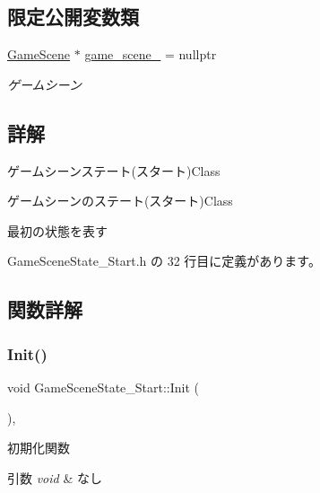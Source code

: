 \subsection*{限定公開変数類}
\begin{DoxyCompactItemize}
\item 
\mbox{\hyperlink{class_game_scene}{Game\+Scene}} $\ast$ \mbox{\hyperlink{class_game_scene_state___start_af9389c7c8496419a6a4a3d3339acd94f}{game\+\_\+scene\+\_\+}} = nullptr
\begin{DoxyCompactList}\small\item\em ゲームシーン \end{DoxyCompactList}\end{DoxyCompactItemize}


\subsection{詳解}
ゲームシーンステート(スタート)Class 

ゲームシーンのステート(スタート)Class

最初の状態を表す 

 Game\+Scene\+State\+\_\+\+Start.\+h の 32 行目に定義があります。



\subsection{関数詳解}
\mbox{\label{class_game_scene_state___start_ae921c57f349fbb2f00a197d40a3404b7}} 
\subsubsection{\texorpdfstring{Init()}{Init()}}
{\footnotesize\ttfamily void Game\+Scene\+State\+\_\+\+Start\+::\+Init (\begin{DoxyParamCaption}{ }\end{DoxyParamCaption})\hspace{0.3cm}{\ttfamily [override]}, {\ttfamily [virtual]}}



初期化関数 


\begin{DoxyParams}{引数}
{\em void} & なし \\
\hline
\end{DoxyParams}

